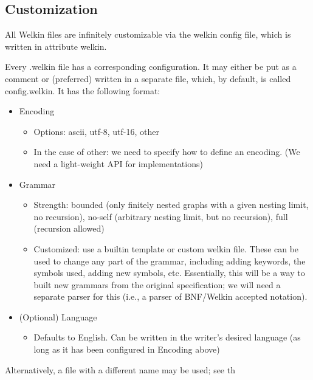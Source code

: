 \subsection{Customization}
All Welkin files are infinitely customizable via the welkin config file, which is written in attribute welkin.

Every .welkin file has a corresponding configuration. It may either be put as a comment or (preferred) written in a separate file, which, by default, is called config.welkin. It has the following format:
\begin{itemize}
	\item Encoding
				\begin{itemize}
					\item Options: ascii, utf-8, utf-16, other
					\item In the case of other: we need to specify how to define an encoding. (We need a light-weight API for implementations)
				\end{itemize}
	\item Grammar
				\begin{itemize}
					\item Strength: bounded (only finitely nested graphs with a given nesting limit, no recursion), no-self (arbitrary nesting limit, but no recursion), full (recursion allowed)
					\item Customized: use a builtin template or custom welkin file. These can be used to change any part of the grammar, including adding keywords, the symbols used, adding new symbols, etc. Essentially, this will be a way to built new grammars from the original specification; we will need a separate parser for this (i.e., a parser of BNF/Welkin accepted notation).
				\end{itemize}

	\item (Optional) Language
				\begin{itemize}
					\item Defaults to English. Can be written in the writer's desired language (as long as it has been configured in Encoding above)
				\end{itemize}
\end{itemize}

Alternatively, a file with a different name may be used; see th


